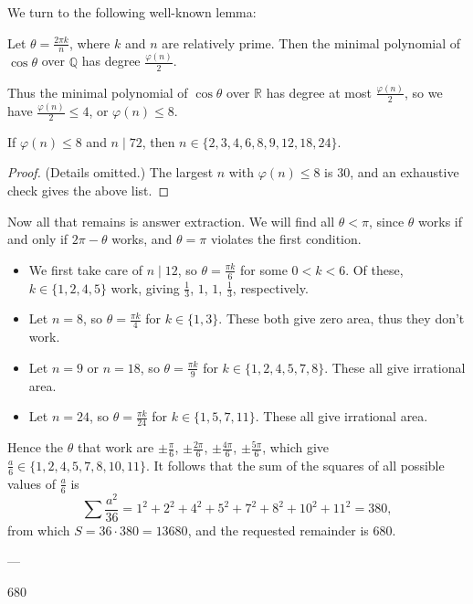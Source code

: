 We turn to the following well-known lemma:
\begin{lemma*}
    Let $\theta=\frac{2\pi k}n$, where $k$ and $n$ are relatively prime. Then the minimal polynomial of $\cos\theta$ over $\mathbb Q$ has degree $\frac{\varphi(n)}2$.
\end{lemma*}

Thus the minimal polynomial of $\cos\theta$ over $\mathbb R$ has degree at most $\frac{\varphi(n)}2$, so we have $\frac{\varphi(n)}2\le4$, or $\varphi(n)\le8$.
\begin{claim*}[Extracting $n$]
    If $\varphi(n)\le8$ and $n\mid 72$, then $n\in\{2,3,4,6,8,9,12,18,24\}$.
\end{claim*}
\begin{proof}
    (Details omitted.) The largest $n$ with $\varphi(n)\le8$ is $30$, and an exhaustive check gives the above list.
\end{proof}

Now all that remains is answer extraction. We will find all $\theta<\pi$, since $\theta$ works if and only if $2\pi-\theta$ works, and $\theta=\pi$ violates the first condition.
\begin{itemize}
    \item We first take care of $n\mid12$, so $\theta=\frac{\pi k}6$ for some $0<k<6$. Of these, $k\in\{1,2,4,5\}$ work, giving $\frac13$, $1$, $1$, $\frac13$, respectively.
    \item Let $n=8$, so $\theta=\frac{\pi k}4$ for $k\in\{1,3\}$. These both give zero area, thus they don't work.
    \item Let $n=9$ or $n=18$, so $\theta=\frac{\pi k}9$ for $k\in\{1,2,4,5,7,8\}$. These all give irrational area.
    \item Let $n=24$, so $\theta=\frac{\pi k}{24}$ for $k\in\{1,5,7,11\}$. These all give irrational area.
\end{itemize}
Hence the $\theta$ that work are $\pm\frac\pi6$, $\pm\frac{2\pi}6$, $\pm\frac{4\pi}6$, $\pm\frac{5\pi}6$, which give $\frac a6\in\{1,2,4,5,7,8,10,11\}$. It follows that the sum of the squares of all possible values of $\frac a6$ is \[\sum\frac{a^2}{36}=1^2+2^2+4^2+5^2+7^2+8^2+10^2+11^2=380,\]
from which $S=36\cdot380=13680$, and the requested remainder is $680$.

---

680
